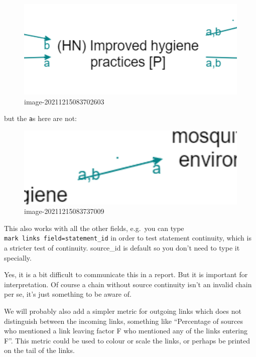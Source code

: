 \documentclass[
]{book}
\begin{document}
\begin{figure}
\centering
\includegraphics[width=6.77083in,height=\textheight]{_assets/image-20211215083702603.png}
\caption{image-20211215083702603}
\end{figure}

but the \texttt{a}s here are not:

\begin{figure}
\centering
\includegraphics[width=6.77083in,height=\textheight]{_assets/image-20211215083737009.png}
\caption{image-20211215083737009}
\end{figure}

This also works with all the other fields, e.g.~you can type \texttt{mark\ links\ field=statement\_id} in order to test statement continuity, which is a stricter test of continuity. source\_id is default so you don't need to type it specially.

Yes, it is a bit difficult to communicate this in a report. But it is important for interpretation. Of course a chain without source continuity isn't an invalid chain per se, it's just something to be aware of.

We will probably also add a simpler metric for outgoing links which does not distinguish between the incoming links, something like ``Percentage of sources who mentioned a link leaving factor F who mentioned any of the links entering F''. This metric could be used to colour or scale the links, or perhaps be printed on the tail of the links.
\end{document}
